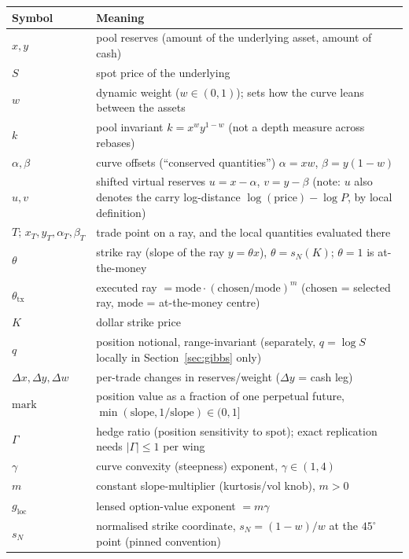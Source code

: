 \documentclass[runningheads]{llncs}
\begin{document}
\begin{center}
\begin{tabularx}{\textwidth}{@{}l >{\raggedright\arraybackslash}X@{}}
\toprule
Symbol & Meaning \\
\midrule
$x,y$ & pool reserves (amount of the underlying asset, amount of cash) \\
$S$ & spot price of the underlying \\
$w$ & dynamic weight ($w\in(0,1)$); sets how the curve leans between the assets \\
$k$ & pool invariant $k=x^{w}y^{1-w}$ (not a depth measure across rebases) \\
$\alpha,\beta$ & curve offsets (``conserved quantities'') $\alpha=xw$, $\beta=y(1-w)$ \\
$u,v$ & shifted virtual reserves $u=x-\alpha$, $v=y-\beta$ (note: $u$ also denotes the carry log-distance $\log(\text{price})-\log P$, by local definition) \\
$T;\,x_T,y_T,\alpha_T,\beta_T$ & trade point on a ray, and the local quantities evaluated there \\
$\theta$ & strike ray (slope of the ray $y=\theta x$), $\theta=s_{N}(K)$; $\theta=1$ is at-the-money \\
$\theta_{\mathrm{tx}}$ & executed ray $=\mathrm{mode}\cdot(\mathrm{chosen}/\mathrm{mode})^{m}$ ($\mathrm{chosen}$ = selected ray, $\mathrm{mode}$ = at-the-money centre) \\
$K$ & dollar strike price \\
$q$ & position notional, range-invariant (separately, $q=\log S$ locally in Section~\ref{sec:gibbs} only) \\
$\Delta x,\Delta y,\Delta w$ & per-trade changes in reserves/weight ($\Delta y$ = cash leg) \\
$\mathrm{mark}$ & position value as a fraction of one perpetual future, $\min(\mathrm{slope},1/\mathrm{slope})\in(0,1]$ \\
$\Gamma$ & hedge ratio (position sensitivity to spot); exact replication needs $|\Gamma|\le1$ per wing \\
$\gamma$ & curve convexity (steepness) exponent, $\gamma\in(1,4)$ \\
$m$ & constant slope-multiplier (kurtosis/vol knob), $m>0$ \\
$g_{\mathrm{loc}}$ & lensed option-value exponent $=m\gamma$ \\
$s_{N}$ & normalised strike coordinate, $s_{N}=(1-w)/w$ at the $45^{\circ}$ point (pinned convention) \\

\end{tabularx}
\end{center}
\end{document}
